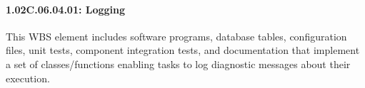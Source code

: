 \paragraph*{1.02C.06.04.01: Logging}

This WBS element includes software programs, database tables, configuration files, unit tests, component integration tests, and documentation that implement a set of classes/functions enabling tasks to log diagnostic messages about their execution.

